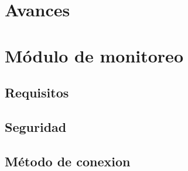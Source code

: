 

\section{Avances}


\section{Módulo de monitoreo}

\subsection*{Requisitos}

\subsection*{Seguridad}

\subsection*{Método de conexion}
